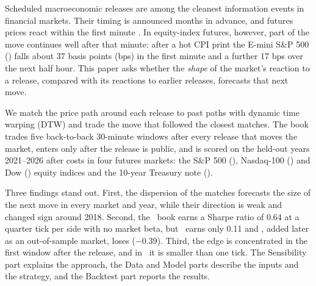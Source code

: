 
Scheduled macroeconomic releases are among the cleanest information events in financial markets.
Their timing is announced months in advance, and futures prices react within the first minute
\citep{Fleming1999, Balduzzi2001, Andersen2003}. In equity-index futures, however, part of the
move continues well after that minute: after a hot CPI print the E-mini S\&P 500 (\ES) falls about
37 basis points (bps) in the first minute and a further 17 bps over the next half hour. This paper
asks whether the \emph{shape} of the market's reaction to a release, compared with its reactions
to earlier releases, forecasts that next move.

We match the price path around each release to past paths with dynamic time warping (DTW) and
trade the move that followed the closest matches. The book trades five back-to-back 30-minute
windows after every release that moves the market, enters only after the release is public, and
is scored on the held-out years 2021--2026 after costs in four futures markets: the S\&P 500 (\ES),
Nasdaq-100 (\NQ) and Dow (\YM) equity indices and the 10-year Treasury note (\ZN).

Three findings stand out. First, the dispersion of the matches forecasts the size of the next
move in every market and year, while their direction is weak and changed sign around 2018.
Second, the \ES\ book earns a Sharpe ratio of 0.64 at a quarter tick per side with no market beta,
but \NQ\ earns only 0.11 and \YM, added later as an out-of-sample market, loses ($-0.39$). Third,
the edge is concentrated in the first window after the release, and in \ZN\ it is smaller than
one tick. The Sensibility part explains the approach, the Data and Model parts describe the inputs
and the strategy, and the Backtest part reports the results.
